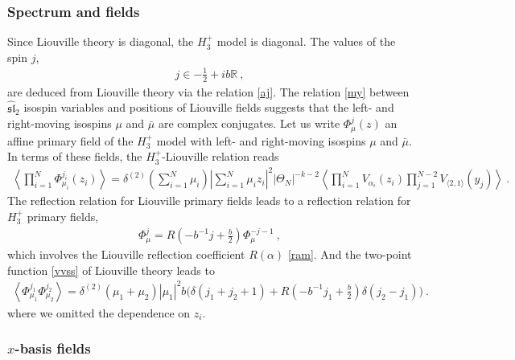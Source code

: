 \documentclass[12pt, a4paper, notitlepage, twoside]{report}
\numberwithin{equation}{section}
\theoremstyle{break}
\begin{document}
\subsubsection{Spectrum and fields}

Since Liouville theory is diagonal, the $H_3^+$ model is diagonal.
The values of the spin $j$,
\begin{align}
 \boxed{j\in -\frac12 + ib\mathbb{R}}\ , 
\end{align}
are deduced from Liouville theory via the relation \eqref{aj}. The relation \eqref{my} between $\widehat{\mathfrak{sl}}_2$ isospin variables and positions of Liouville fields suggests that the left- and right-moving isospins $\mu$ and $\bar\mu$ are complex conjugates. Let us write $\Phi^j_\mu(z)$ an affine primary field of the $H_3^+$ model with left- and right-moving isospins $\mu$ and $\bar\mu$. In terms of these fields, the $H_3^+$-Liouville relation reads 
\begin{align}
 \boxed{ \left\langle \prod_{i=1}^N \Phi^{j_i}_{\mu_i}(z_i)\right\rangle 
 = \delta^{(2)}\left({\textstyle\sum_{i=1}^N \mu_i}\right) 
 \left|{\textstyle\sum_{i=1}^N\mu_iz_i}\right|^2 |\Theta_N|^{-k-2} 
 \left\langle \prod_{i=1}^N V_{\alpha_i}(z_i)\prod_{j=1}^{N-2}V_{\langle 2,1\rangle}(y_j)\right\rangle}\ .
\label{dyym} 
\end{align}
The reflection relation for Liouville primary fields leads to a reflection relation for $H_3^+$ primary fields,
\begin{align}
 \Phi^j_{\mu} = R(-b^{-1}j+\tfrac{b}{2}) \Phi^{-j-1}_{\mu} \ ,
\end{align}
which involves the Liouville reflection coefficient $R(\alpha)$ \eqref{ram}.
And the two-point function \eqref{vvss} of Liouville theory leads to
\begin{align}
 \left\langle \Phi^{j_1}_{\mu_1} \Phi^{j_2}_{\mu_2}\right\rangle = \delta^{(2)}(\mu_1+\mu_2) |\mu_1|^2 b\Big(\delta(j_1+j_2+1)+R\left(-b^{-1}j_1+\tfrac{b}{2}\right) \delta(j_2-j_1) \Big)\ .
\end{align}
where we omitted the dependence on $z_i$.

\subsubsection{$x$-basis fields}
\end{document}
